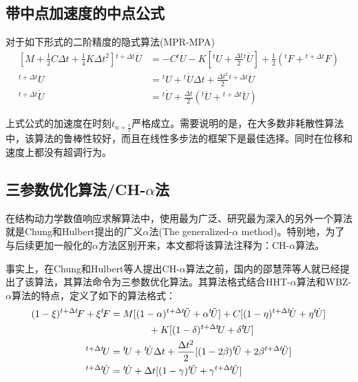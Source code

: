 \subsection{带中点加速度的中点公式}
对于如下形式的二阶精度的隐式算法\cite{JasonHar2012}(MPR-MPA)
\begin{subequations}
\begin{align}
\left[M+\frac{1}{2}C\Delta t+\frac{1}{4}K\Delta t^2\right]{^{t+\Delta t}\!\ddot{U}}&=-C{^t\!\dot{U}}-K\left[{^t\!U}+\frac{\Delta t}{2}{^t\!\dot{U}}\right]+\frac{1}{2}({^t\!F}+{^{t+\Delta t}\!F})\\
{^{t+\Delta t}\!U}&={^t\!U}+{^t\!\dot{U}}\Delta t+\frac{\Delta t^2}{2}{^{t+\Delta t}\!\ddot{U}}\\
{^{t+\Delta t}\!\dot{U}}&={^t\!\dot{U}}+\frac{\Delta t}{2}({^t\!\ddot{U}}+{^{t+\Delta t}\!\ddot{U}})
\end{align}
\end{subequations}

上式公式的加速度在时刻$t_{n+\frac{1}{2}}$严格成立。需要说明的是，在大多数非耗散性算法中，该算法的鲁棒性较好，而且在线性多步法的框架下是最佳选择。同时在位移和速度上都没有超调行为。

\subsection{三参数优化算法/CH-$\alpha$法}
在结构动力学数值响应求解算法中，使用最为广泛、研究最为深入的另外一个算法就是Chung和Hulbert提出的广义$\alpha$法(The generalized-$\alpha$ method)\cite{Chung1993}。特别地，为了与后续更加一般化的$\alpha$方法\cite{KaiPing2008}区别开来，本文都将该算法注释为：CH-$\alpha$算法。

事实上，在Chung和Hulbert等人提出CH-$\alpha$算法之前，国内的邵慧萍等人就已经提出了该算法，其算法命令为三参数优化算法\cite{邵慧萍1988}。其算法格式结合HHT-$\alpha$算法和WBZ-$\alpha$算法的特点，定义了如下的算法格式：
\begin{subequations}
\begin{align}
(1-\xi){^{t+\Delta t}\!F}+\xi{^t\!F}&=M[(1-\alpha){^{t+\Delta t}\!\ddot{U}}+\alpha {^t\!\ddot{U}}]+C[(1-\eta){^{t+\Delta t}\!\dot{U}}+\eta{^t\!\dot{U}}]\notag\\
&\qquad\qquad+K[(1-\delta){^{t+\Delta t}\!U}+\delta{^t\!U}]\\
{^{t+\Delta t}\!{U}}&={^t\!U}+{^t\!\dot{U}}\Delta t+\frac{\Delta t^2}{2}[(1-2\beta){^t\!\ddot{U}}+2\beta{^{t+\Delta t}\!\ddot{U}}]\\
{^{t+\Delta t}\!\dot{U}}&={^t\!\dot{U}}+\Delta t[(1-\gamma){^t\!\ddot{U}}+\gamma{^{t+\Delta t}\!\ddot{U}}]
\end{align}
\end{subequations}

